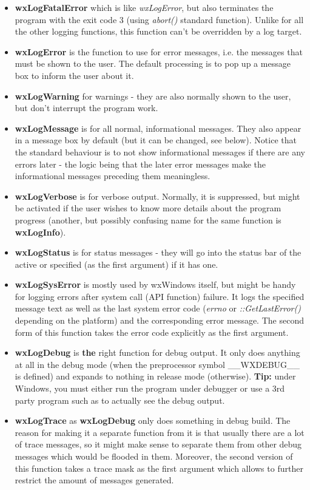 \begin{itemize}\itemsep=0pt
\item{\bf wxLogFatalError} which is like {\it wxLogError}, but also
terminates the program with the exit code $3$ (using {\it abort()} standard
function). Unlike for all the other logging functions, this function can't be
overridden by a log target.
\item{\bf wxLogError} is the function to use for error messages, i.e. the
messages that must be shown to the user. The default processing is to pop up a
message box to inform the user about it.
\item{\bf wxLogWarning} for warnings - they are also normally shown to the
user, but don't interrupt the program work.
\item{\bf wxLogMessage} is for all normal, informational messages. They also
appear in a message box by default (but it can be changed, see below). Notice
that the standard behaviour is to not show informational messages if there are
any errors later - the logic being that the later error messages make the
informational messages preceding them meaningless.
\item{\bf wxLogVerbose} is for verbose output. Normally, it is suppressed, but
might be activated if the user wishes to know more details about the program
progress (another, but possibly confusing name for the same function is {\bf
wxLogInfo}).
\item{\bf wxLogStatus} is for status messages - they will go into the status
bar of the active or specified (as the first argument)  if it has one.
\item{\bf wxLogSysError} is mostly used by wxWindows itself, but might be
handy for logging errors after system call (API function) failure. It logs the
specified message text as well as the last system error
code ({\it errno} or {\it ::GetLastError()} depending on the platform) and
the corresponding error message. The second form of this function takes the
error code explicitly as the first argument.
\item{\bf wxLogDebug} is {\bf the} right function for debug output. It only
does anything at all in the debug mode (when the preprocessor symbol
\_\_WXDEBUG\_\_ is defined) and expands to nothing in release mode (otherwise).
{\bf Tip:} under Windows, you must either run the program under debugger or
use a 3rd party program such as  
to actually see the debug output.
\item{\bf wxLogTrace} as {\bf wxLogDebug} only does something in debug
build. The reason for making it a separate function from it is that usually
there are a lot of trace messages, so it might make sense to separate them
from other debug messages which would be flooded in them. Moreover, the second
version of this function takes a trace mask as the first argument which allows
to further restrict the amount of messages generated.
\end{itemize}

